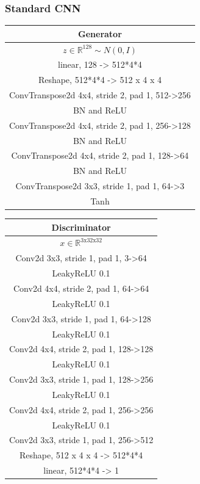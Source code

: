 \documentclass{article}
\begin{document}
\subsubsection{Standard CNN}

\begin{tabular}{c}
	Generator \\
	\toprule\midrule
	$z \in \mathbb{R}^{128} \sim N(0,I)$ \\
	\midrule
	linear, 128 -> 512*4*4 \\
	\midrule
	Reshape, 512*4*4 -> 512 x 4 x 4 \\
	\midrule
	ConvTranspose2d 4x4, stride 2, pad 1, 512->256 \\
	\midrule
	BN and ReLU \\
	\midrule
	ConvTranspose2d 4x4, stride 2, pad 1, 256->128 \\
	\midrule
	BN and ReLU \\
	\midrule
	ConvTranspose2d 4x4, stride 2, pad 1, 128->64 \\
	\midrule
	BN and ReLU \\
	\midrule
	ConvTranspose2d 3x3, stride 1, pad 1, 64->3 \\
	\midrule
	Tanh \\
	\bottomrule
\end{tabular} 
\quad
\begin{tabular}{c}
	Discriminator \\
	\toprule\midrule
	$x \in \mathbb{R}^{\text{3x32x32}}$ \\
	\midrule
	Conv2d 3x3, stride 1, pad 1, 3->64 \\
	\midrule
	LeakyReLU 0.1 \\
	\midrule
	Conv2d 4x4, stride 2, pad 1, 64->64 \\
	\midrule
	LeakyReLU 0.1 \\
	\midrule
	Conv2d 3x3, stride 1, pad 1, 64->128 \\
	\midrule
	LeakyReLU 0.1 \\
	\midrule
	Conv2d 4x4, stride 2, pad 1, 128->128 \\
	\midrule
	LeakyReLU 0.1 \\
	\midrule
	Conv2d 3x3, stride 1, pad 1, 128->256 \\
	\midrule
	LeakyReLU 0.1 \\
	\midrule
	Conv2d 4x4, stride 2, pad 1, 256->256 \\
	\midrule
	LeakyReLU 0.1 \\
	\midrule
	Conv2d 3x3, stride 1, pad 1, 256->512 \\
	\midrule
	Reshape, 512 x 4 x 4 -> 512*4*4 \\
	\midrule
	linear, 512*4*4 -> 1 \\
	\bottomrule
\end{tabular}
\end{document}
